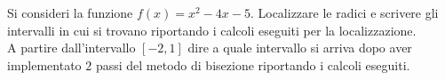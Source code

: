 Si consideri la funzione $f(x)=x^2-4x-5$. Localizzare le radici e 
scrivere gli intervalli in cui si trovano riportando i calcoli 
eseguiti per la localizzazione.\\

\noindent A partire dall'intervallo $[-2, 1]$ dire a quale 
intervallo si arriva dopo aver implementato $2$ passi del metodo 
di bisezione riportando i calcoli eseguiti.
